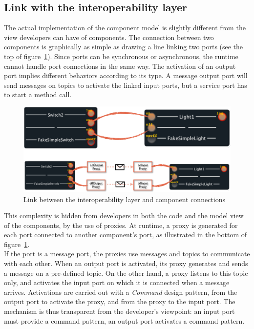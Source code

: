 \subsection{Link with the interoperability layer}
\label{subsec:compModLinkWithInterop}
The actual implementation of the component model is slightly different from the view developers can have of components. The connection between two components is graphically as simple as drawing a line linking two ports (see the top of figure~\ref{fig:linkWithInteropLayer}). Since ports can be synchronous or asynchronous, the runtime cannot handle port connections in the same way. The activation of an output port implies different behaviors according to its type. A message output port will send messages on topics to activate the linked input ports, but a service port has to start a method call.\\

\begin{figure}[h!]
\includegraphics[width=\textwidth]{part2/pics/InteropModelLink}
\caption{Link between the interoperability layer and component connections}
\label{fig:linkWithInteropLayer}
\end{figure}

This complexity is hidden from developers in both the code and the model view of the components, by the use of proxies. At runtime, a proxy is generated for each port connected to another component's port, as illustrated in the bottom of figure~\ref{fig:linkWithInteropLayer}.\\
If the port is a message port, the proxies use messages and topics to communicate with each other. When an output port is activated, its proxy generates and sends a message on a pre-defined topic. On the other hand, a proxy listens to this topic only, and activates the input port on which it is connected when a message arrives. Activations are carried out with a {\it Command} design pattern, from the output port to activate the proxy, and from the proxy to the input port. The mechanism is thus transparent from the developer's viewpoint: an input port must provide a command pattern, an output port activates a command pattern.\\

